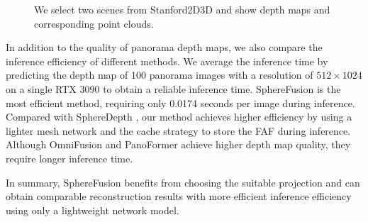 \begin{figure} [t]
    \vspace{-1.0em}
	
	\hspace{0.1em}	
	\hspace{0.1em}
	\hspace{0.1em}
	\vspace{-1.0em}
	\caption{
        We select two scenes from Stanford2D3D \cite{armeni2017joint} and show depth maps and corresponding point clouds.
	}
	\label{fig:2d3d_depth_cloud}
    \vspace{-1.5em}
\end{figure}


In addition to the quality of panorama depth maps, we also compare the inference efficiency of different methods. 
We average the inference time by predicting the depth map of 100 panorama images with a resolution of $512 \times 1024$ on a single RTX 3090 to obtain a reliable inference time. 
SphereFusion is the most efficient method, requiring only 0.0174 seconds per image during inference.
Compared with SphereDepth \cite{yan2022spheredepth}, our method achieves higher efficiency by using a lighter mesh network and the cache strategy to store the FAF during inference. 
Although OmniFusion \cite{li2022omnifusion} and PanoFormer \cite{shen2022panoformer} achieve higher depth map quality, they require longer inference time. 

In summary, SphereFusion benefits from choosing the suitable projection and can obtain comparable reconstruction results with more efficient inference efficiency using only a lightweight network model.

